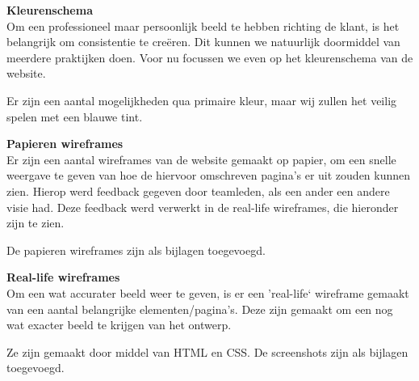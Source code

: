 {\bf Kleurenschema} \\

Om een professioneel maar persoonlijk beeld te hebben richting de klant,
is het belangrijk om consistentie te cre\"eren.
Dit kunnen we natuurlijk doormiddel van meerdere praktijken doen.
Voor nu focussen we even op het kleurenschema van de website.

Er zijn een aantal mogelijkheden qua primaire kleur,
maar wij zullen het veilig spelen met een blauwe tint.



{\bf Papieren wireframes} \\

Er zijn een aantal wireframes van de website gemaakt op papier,
om een snelle weergave te geven van hoe de hiervoor omschreven pagina's
er uit zouden kunnen zien.
Hierop werd feedback gegeven door teamleden,
als een ander een andere visie had.
Deze feedback werd verwerkt in de real-life wireframes, die hieronder zijn te zien.

De papieren wireframes zijn als bijlagen toegevoegd.


{\bf Real-life wireframes} \\

Om een wat accurater beeld weer te geven,
is er een 'real-life` wireframe gemaakt van een aantal belangrijke elementen/pagina's.
Deze zijn gemaakt om een nog wat exacter beeld te krijgen van het ontwerp.

Ze zijn gemaakt door middel van HTML en CSS.
De screenshots zijn als bijlagen toegevoegd.




